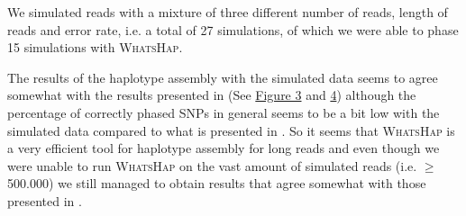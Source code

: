 \documentclass[10pt,a4paper]{article}
\begin{document}
We simulated reads with a mixture of three different number of reads, length of reads and error rate, i.e. a total of 27 simulations, of which we were able to phase 15 simulations with \textsc{WhatsHap}.

The results of the haplotype assembly with the simulated data seems to agree somewhat with the results presented in \cite{whatshap} (See \hyperref[fig:unphasable100k]{Figure 3} and \hyperref[fig:unphasable500k]{4}) although the percentage of correctly phased SNPs in general seems to be a bit low with the simulated data compared to what is presented in \cite{whatshap}. So it seems that \textsc{WhatsHap} is a very efficient tool for haplotype assembly for long reads and even though we were unable to run \textsc{WhatsHap} on the vast amount of simulated reads (i.e. $\geq$ 500.000) we still managed to obtain results that agree somewhat with those presented in \cite{whatshap}.

\newpage
{}
{}

\newpage
\appendix
\end{document}
